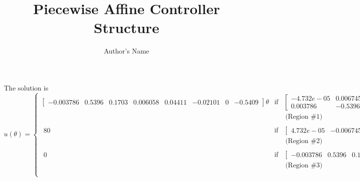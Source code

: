 \documentclass[11pt]{article}
\newcommand{\ba}[1]{\begin{array}{#1}}
\newcommand{\ea}{\end{array}}
\newcommand{\smallnum}[1]{\begin{smallmatrix}#1 \end{smallmatrix}}
\newcommand{\smallmat}[1]{\left[ \begin{smallmatrix}#1 \end{smallmatrix} \right]}
\begin{document}
\title{\bf Piecewise Affine Controller Structure}

\author{Author's Name}

\maketitle

The solution is
\vspace{1cm}
\[ 
u(\theta) = \left\{\ba{lcll}
\smallmat{-0.003786 &  0.5396 &  0.1703 & 0.006058 & 0.04411 & -0.02101 &       0 & -0.5409}
 \theta& \mbox{if} &  
 \smallmat{-4.732e-05 & 0.006745 & 0.002129 & 7.572e-05 & 0.0005513 & -0.0002626 &       0 & -0.006762\\ 
0.003786 & -0.5396 & -0.1703 & -0.006058 & -0.04411 & 0.02101 &      -0 &  0.5409} \theta \leq \smallmat{      1 & \\ 
      0 & } \\
 & &\ \mbox{(Region \#1)}\\ \\ 
\smallnum{      80}& \mbox{if} &  
 \smallmat{4.732e-05 & -0.006745 & -0.002129 & -7.572e-05 & -0.0005513 & 0.0002626 &       0 & 0.006762} \theta \leq \smallmat{     -1 & } \\
 & &\ \mbox{(Region \#2)}\\ \\ 
\smallnum{       0}& \mbox{if} &  
 \smallmat{-0.003786 &  0.5396 &  0.1703 & 0.006058 & 0.04411 & -0.02101 &       0 & -0.5409} \theta \leq \smallmat{      0 & } \\
 & &\ \mbox{(Region \#3)}\\ \\ 
\ea\right.
 \] 
\end{document}
